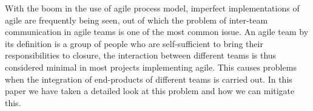 With the boom in the use of agile process model, imperfect implementations of agile are frequently being seen, out of which the problem of inter-team communication in agile teams is one of the most common issue. An agile team by its definition is a group of people who are self-sufficient to bring their responsibilities to closure, the interaction between different teams is thus considered minimal in most projects implementing agile. This causes problems when the integration of end-products of different teams is carried out. In this paper we have taken a detailed look at this problem and how we can mitigate this.